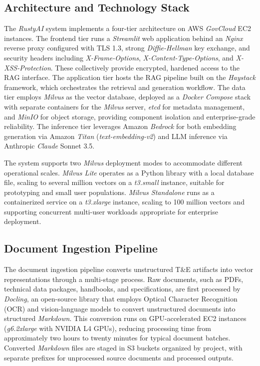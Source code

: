 \documentclass[12pt,letterpaper]{article}
\begin{document}
\subsection{Architecture and Technology Stack}

The \textit{RustyAI} system implements a four-tier architecture on AWS \textit{GovCloud} EC2 instances. The frontend tier runs a \textit{Streamlit} web application behind an \textit{Nginx} reverse proxy configured with TLS 1.3, strong \textit{Diffie-Hellman} key exchange, and security headers including \textit{X-Frame-Options}, \textit{X-Content-Type-Options}, and \textit{X-XSS-Protection}. These collectively provide encrypted, hardened access to the RAG interface. The application tier hosts the RAG pipeline built on the \textit{Haystack} framework, which orchestrates the retrieval and generation workflow. The data tier employs \textit{Milvus} as the vector database, deployed as a \textit{Docker Compose} stack with separate containers for the \textit{Milvus} server, \textit{etcd} for metadata management, and \textit{MinIO} for object storage, providing component isolation and enterprise-grade reliability. The inference tier leverages Amazon \textit{Bedrock} for both embedding generation via Amazon \textit{Titan} (\textit{text-embedding-v2}) and LLM inference via Anthropic \textit{Claude} Sonnet 3.5.

The system supports two \textit{Milvus} deployment modes to accommodate different operational scales. \textit{Milvus Lite} operates as a Python library with a local database file, scaling to several million vectors on a \textit{t3.small} instance, suitable for prototyping and small user populations. \textit{Milvus Standalone} runs as a containerized service on a \textit{t3.xlarge} instance, scaling to 100 million vectors and supporting concurrent multi-user workloads appropriate for enterprise deployment.

\subsection{Document Ingestion Pipeline}

The document ingestion pipeline converts unstructured T\&E artifacts into vector representations through a multi-stage process. Raw documents, such as PDFs, technical data packages, handbooks, and specifications, are first processed by \textit{Docling}, an open-source library that employs Optical Character Recognition (OCR) and vision-language models to convert unstructured documents into structured \textit{Markdown}. This conversion runs on GPU-accelerated EC2 instances (\textit{g6.2xlarge} with NVIDIA L4 GPUs), reducing processing time from approximately two hours to twenty minutes for typical document batches. Converted \textit{Markdown} files are staged in S3 buckets organized by project, with separate prefixes for unprocessed source documents and processed outputs.
\end{document}
